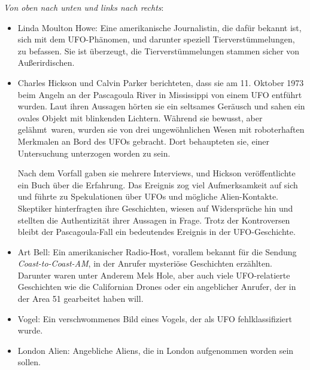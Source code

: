 \documentclass{scrartcl}
\begin{document}
\textit{Von oben nach unten und links nach rechts}:

\begin{itemize}
	\item Linda Moulton Howe: Eine amerikanische Journalistin, die dafür bekannt ist, sich mit dem UFO-Phänomen, und darunter speziell Tierverstümmelungen, zu befassen. Sie ist überzeugt, die Tierverstümmelungen stammen sicher von Außerirdischen. 
	\item Charles Hickson und Calvin Parker berichteten, dass sie am 11. Oktober 1973 beim Angeln an der Pascagoula River in Mississippi von einem UFO entführt wurden. Laut ihren Aussagen hörten sie ein seltsames Geräusch und sahen ein ovales Objekt mit blinkenden Lichtern. Während sie \frqq bewusst, aber gelähmt\flqq\ waren, wurden sie von drei ungewöhnlichen Wesen mit roboterhaften Merkmalen an Bord des UFOs gebracht. Dort behaupteten sie, einer Untersuchung unterzogen worden zu sein.

Nach dem Vorfall gaben sie mehrere Interviews, und Hickson veröffentlichte ein Buch über die Erfahrung. Das Ereignis zog viel Aufmerksamkeit auf sich und führte zu Spekulationen über UFOs und mögliche Alien-Kontakte. Skeptiker hinterfragten ihre Geschichten, wiesen auf Widersprüche hin und stellten die Authentizität ihrer Aussagen in Frage. Trotz der Kontroversen bleibt der Pascagoula-Fall ein bedeutendes Ereignis in der UFO-Geschichte.

	\item Art Bell: Ein amerikanischer Radio-Host, vorallem bekannt für die Sendung \textit{Coast-to-Coast-AM}, in der Anrufer mysteriöse Geschichten erzählten. Darunter waren unter Anderem Mels Hole, aber auch viele UFO-relatierte Geschichten wie die Californian Drones oder ein angeblicher Anrufer, der in der Area 51 gearbeitet haben will.
	\item Vogel: Ein verschwommenes Bild eines Vogels, der als UFO fehlklassifiziert wurde.
	\item London Alien: Angebliche Aliens, die in London aufgenommen worden sein sollen.
\end{itemize}
\end{document}
